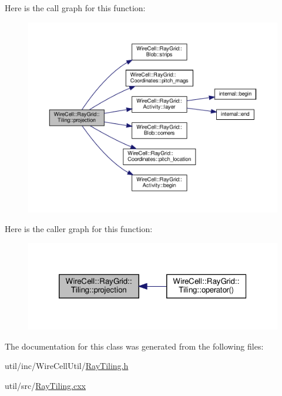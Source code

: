 Here is the call graph for this function\+:
\nopagebreak
\begin{figure}[H]
\begin{center}
\leavevmode
\includegraphics[width=350pt]{class_wire_cell_1_1_ray_grid_1_1_tiling_a621e1fdb35b900f3eb6dcd2e933b40d9_cgraph}
\end{center}
\end{figure}
Here is the caller graph for this function\+:
\nopagebreak
\begin{figure}[H]
\begin{center}
\leavevmode
\includegraphics[width=320pt]{class_wire_cell_1_1_ray_grid_1_1_tiling_a621e1fdb35b900f3eb6dcd2e933b40d9_icgraph}
\end{center}
\end{figure}


The documentation for this class was generated from the following files\+:\begin{DoxyCompactItemize}
\item 
util/inc/\+Wire\+Cell\+Util/\hyperlink{_ray_tiling_8h}{Ray\+Tiling.\+h}\item 
util/src/\hyperlink{_ray_tiling_8cxx}{Ray\+Tiling.\+cxx}\end{DoxyCompactItemize}
